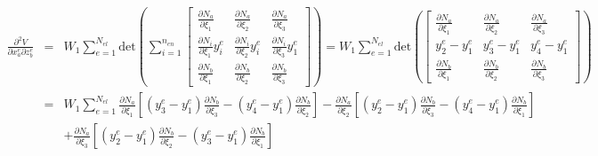 \begin{eqnarray}
\frac{\partial^2 V}{\partial x_a^e \partial z_b^e} &=&  W_1\sum_{e=1}^{N_{el}} \text{det}\left(\sum_{i=1}^{n_{en}}
%
\begin{bmatrix}
\frac{\partial N_a}{\partial \xi_1}  &  \frac{\partial N_a}{\partial \xi_2} &  \frac{\partial N_a}{\partial \xi_3}\\
%
\frac{\partial N_i}{\partial \xi_1}y_i^e  & \frac{\partial N_i}{\partial \xi_2}y_i^e &\frac{\partial N_i}{\partial \xi_3}y_1^e  \\
%
\frac{\partial N_b}{\partial \xi_1}  & \frac{\partial N_b}{\partial \xi_2} & \frac{\partial N_b}{\partial \xi_3} 
\end{bmatrix}\right) 
%
= W_1\sum_{e=1}^{N_{el}} \text{det}\left(
%
\begin{bmatrix}
\frac{\partial N_a}{\partial \xi_1}  &  \frac{\partial N_a}{\partial \xi_2} &  \frac{\partial N_a}{\partial \xi_3}\\
%
y_2^e - y_1^e & y_3^e - y_1^e & y_4^e - y_1^e \\
%
\frac{\partial N_b}{\partial \xi_1}  & \frac{\partial N_b}{\partial \xi_2} & \frac{\partial N_b}{\partial \xi_3} 
\end{bmatrix}\right) \nonumber\\
&=& W_1\sum_{e=1}^{N_{el}}\frac{\partial N_a}{\partial \xi_1}\left[(y_3^e - y_1^e)\frac{\partial N_b}{\partial \xi_3}-(y_4^e - y_1^e)\frac{\partial N_b}{\partial \xi_2}\right] 
%
-\frac{\partial N_a}{\partial \xi_2}\left[(y_2^e - y_1^e)\frac{\partial N_b}{\partial \xi_3}-(y_4^e - y_1^e)\frac{\partial N_b}{\partial \xi_1}\right] \nonumber\\
%
&&+\frac{\partial N_a}{\partial \xi_3}\left[(y_2^e - y_1^e)\frac{\partial N_b}{\partial \xi_2}-(y_3^e - y_1^e)\frac{\partial N_b}{\partial \xi_1}\right] 
\end{eqnarray}
